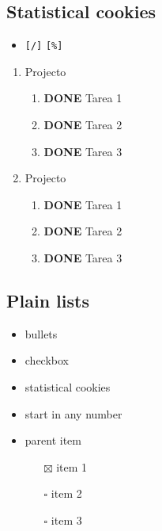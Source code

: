\documentclass[11pt]{article}
\begin{document}
\subsection{Statistical cookies}
\label{sec:orgaad1395}
\begin{itemize}
\item \texttt{[/]} \texttt{[\%]}
\end{itemize}
\begin{enumerate}
\item\relax [3/3] Projecto
\label{sec:orgc348a21}
\begin{enumerate}
\item {\bfseries\sffamily DONE} Tarea 1
\label{sec:orga4356ee}
\item {\bfseries\sffamily DONE} Tarea 2
\label{sec:orgc6a9eb9}
\item {\bfseries\sffamily DONE} Tarea 3
\label{sec:orgd8e179c}
\end{enumerate}

\item\relax [100\%] Projecto
\label{sec:org753cc91}
\begin{enumerate}
\item {\bfseries\sffamily DONE} Tarea 1
\label{sec:orgdc80b14}
\item {\bfseries\sffamily DONE} Tarea 2
\label{sec:org6315808}
\item {\bfseries\sffamily DONE} Tarea 3
\label{sec:org33e8baf}
\end{enumerate}
\end{enumerate}

\subsection{Plain lists}
\label{sec:org326c330}
\begin{itemize}
\item bullets
\item checkbox
\item statistical cookies
\item start in any number

\item parent item
\begin{itemize}
\item[{$\boxtimes$}] item 1
\item[{$\square$}] item 2
\item[{$\square$}] item 3
\end{itemize}
\end{itemize}
\end{document}

